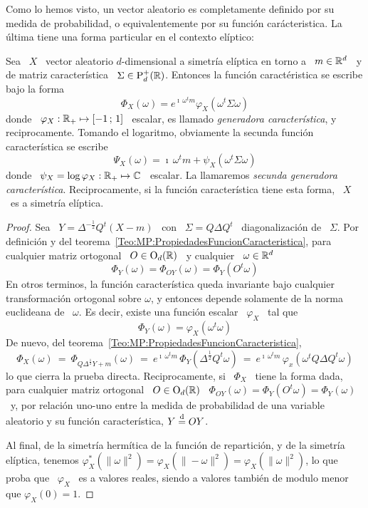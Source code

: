 Como lo hemos visto, un vector aleatorio es completamente definido por su medida
de  probabilidad,  o  equivalentemente  por su  funci\'on  car\'acteristica.  La
\'ultima tiene una forma particular en el contexto el\'iptico:
%
\begin{teorema}
\label{Teo:MP:GeneradorasCaracteristicas}
%
  Sea \ $X$ \ vector  aleatorio $d$-dimensional a simetr\'ia el\'iptica en torno
  a  \  $m   \in  \mathbb{R}^d$  \  y  de  matriz   caracter\'istica  \  $\Sigma  \in
  \mathrm{P}_d^+(\mathbb{R})$. Entonces  la funci\'on  caract\'eristica se escribe  bajo la
  forma
  \[
  \Phi_X(\omega)  = e^{\imath  \,  \omega^t m}  \varphi_X\left( \omega^t  \Sigma
    \omega \right)
  \]
  donde \  $\varphi_X: \mathbb{R}_+  \mapsto [-1  \, ; \, 1]$ \  escalar, es  llamado {\em
    generadora  caracter\'istica},  y   reciprocamente.  Tomando  el  logaritmo,
  obviamente la secunda funci\'on caracter\'istica se escribe
  \[
  \Psi_X(\omega) =  \imath \, \omega^t  m + \psi_X\left( \omega^t  \Sigma \omega
  \right)
  \]
  donde  \ $\psi_X  =  \log \varphi_X:  \mathbb{R}_+  \mapsto \mathbb{C}$  \ escalar.   La
  llamaremos  {\em secunda generadora  caracter\'istica}. Reciprocamente,  si la
  funci\'on  caracter\'istica  tiene  esta  forma,  \  $X$  \  es  a  simetr\'ia
  el\'iptica.
\end{teorema}
%
\begin{proof}
  Sea \  $Y = \Delta^{-\frac12} Q^t  \left( X - m  \right)$ \ con \  $\Sigma = Q
  \Delta  Q^t$  \ diagonalizaci\'on  de  \  $\Sigma$.   Por definici\'on  y  del
  teorema~\ref{Teo:MP:PropiedadesFuncionCaracteristica},  para  cualquier matriz
  ortogonal \ $O \in \mathrm{O}_d(\mathbb{R})$ \ y cualquier \ $\omega \in \mathbb{R}^d$
  \[
  \Phi_Y(\omega) = \Phi_{O Y}(\omega) = \Phi_Y(O^t \omega)
  \]
  En  otros  terminos,  la  funci\'on  caracter\'istica  queda  invariante  bajo
  cualquier  transformaci\'on  ortogonal  sobre  $\omega$,  y  entonces  depende
  solamente  de  la  norma euclideana  de  \  $\omega$.   Es decir,  existe  una
  funci\'on escalar \ $\varphi_X$ \ tal que
  \[
  \Phi_Y(\omega) = \varphi_X(\omega^t \omega)
  \]
  De nuevo, del teorema~\ref{Teo:MP:PropiedadesFuncionCaracteristica},
  \[
  \Phi_X(\omega)  \:  = \:  \Phi_{Q  \Delta^{\frac12} Y  +  m}(\omega)  \: =  \:
  e^{\imath  \, \omega^t  m} \,  \Phi_Y( \Delta^{\frac12}  Q^t \omega)  \:  = \:
  e^{\imath \, \omega^t m} \, \varphi_x( \omega^t Q \Delta Q^t \omega)
  \]
  lo que  cierra la prueba  directa.  Reciprocamente, si  \ $\Phi_X$ \  tiene la
  forma dada, para cualquier matriz ortogonal \ $O \in \mathrm{O}_d(\mathbb{R})$ \ $\Phi_{O
    Y}(\omega)  = \Phi_Y( O^t  \omega )  = \Phi_Y(\omega)$  \ y,  por relaci\'on
  uno-uno  entre  la medida  de  probabilidad de  una  variable  aleatorio y  su
  funci\'on caracter\'istica, $Y \stackrel{\mathrm{d}}{=} O Y$.

  Al final, de la simetr\'ia herm\'itica  de la funci\'on de repartici\'on, y de
  la simetr\'ia el\'iptica, tenemos  $\varphi_X^*\left( \| \omega \|^2 \right) =
  \varphi_X\left(  \| -\omega  \|^2  \right) =  \varphi_X\left(  \| \omega  \|^2
  \right)$,  lo que proba  que \  $\varphi_X$ \  es a  valores reales,  siendo a
  valores tambi\'en de modulo menor que $\varphi_X(0) = 1$.
\end{proof}
